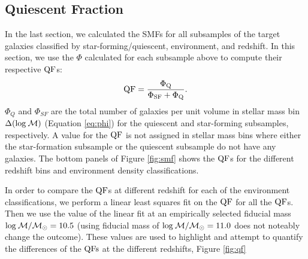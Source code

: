 \documentclass{emulateapj}
\begin{document}


\subsection{Quiescent Fraction} \label{sec:qf_const}
In the last section, we calculated the SMFs for all subsamples of the target galaxies classified by star-forming/quiescent, environment, and redshift. 
In this section, we use the $\Phi$ calculated for each subsample above to compute their respective $\rm{QF}$s: 
\begin{equation}
\rm{QF} = \frac{\Phi_{Q}}{\Phi_{SF}+\Phi_{Q}}.
\end{equation}
$\Phi_{Q}$ and $\Phi_{SF}$ are the total number of galaxies per unit volume in stellar mass bin $\Delta(\rm{log} \: \mathcal{M})$ (Equation \ref{eq:phi}) for the quiescent and star-forming subsamples, respectively.
A value for the $\rm{QF}$ is not assigned in stellar mass bins where either the star-formation subsample or the quiescent subsample do not have any galaxies. 
The bottom panels of Figure \ref{fig:smf} shows the $\rm{QF}$s for the different redshift bins and environment density classifications.

In order to compare the $\rm{QF}$s at different redshift for each of the environment classifications, we perform a linear least squares fit on the $\rm{QF}$ for all the $\rm{QF}$s. 
Then we use the value of the linear fit at an empirically selected fiducial mass $\rm{log} \: \mathcal{M}/\mathcal{M}_{\odot} = 10.5$ (using fiducial mass of $\rm{log} \: \mathcal{M}/
\mathcal{M}_\odot = 11.0$ does not noteably change the outcome).
These values are used to highlight and attempt to quantify the differences of the $\rm{QFs}$ at the different redshifts, Figure \ref{fig:qf}
\end{document}
